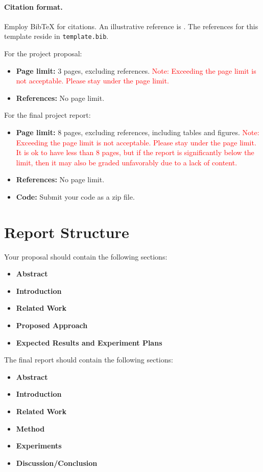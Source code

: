 \documentclass{article}
\begin{document}
\paragraph{Citation format.} Employ BibTeX for citations. An illustrative reference is \cite{vaswani2017attention}. The references for this template reside in \texttt{template.bib}.

For the project proposal:
\begin{itemize}
  \item \textbf{Page limit:} 3 pages, excluding references. \textcolor{red}{Note: Exceeding the page limit is not acceptable. Please stay under the page limit.}
  \item \textbf{References:} No page limit.
\end{itemize}

For the final project report:
\begin{itemize}
  \item \textbf{Page limit:} 8 pages, excluding references, including tables and figures. \textcolor{red}{Note: Exceeding the page limit is not acceptable. Please stay under the page limit. It is ok to have less than 8 pages, but if the report is significantly below the limit, then it may also be graded unfavorably due to a lack of content.}
  \item \textbf{References:} No page limit.
  \item \textbf{Code:} Submit your code as a zip file.
\end{itemize}

\section{Report Structure}
Your proposal should contain the following sections:
\begin{itemize}
  \item \textbf{Abstract}
  \item \textbf{Introduction}
  \item \textbf{Related Work}
  \item \textbf{Proposed Approach}
  \item \textbf{Expected Results and Experiment Plans}
\end{itemize}

The final report should contain the following sections:
\begin{itemize}
  \item \textbf{Abstract}
  \item \textbf{Introduction}
  \item \textbf{Related Work}
  \item \textbf{Method}
  \item \textbf{Experiments}
  \item \textbf{Discussion/Conclusion}
\end{itemize}
\end{document}

